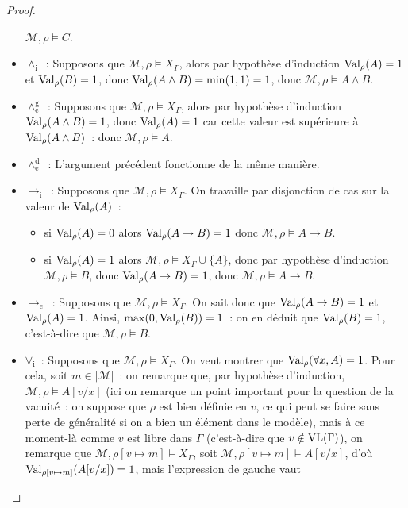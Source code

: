 \begin{proof}
\begin{itemize}
    $\mathcal M,\rho\models C$.
  \item $\land_\mathrm i$~: Supposons que $\mathcal M,\rho\models X_\Gamma$,
    alors par hypothèse d'induction $\operatorname{Val}_\rho(A) = 1$ et $\operatorname{Val}_\rho(B) = 1$,
    donc $\operatorname{Val}_\rho(A\land B) = \min(1,1) = 1$, donc
    $\mathcal M,\rho\models A\land B$.
  \item $\land_\mathrm e^\mathrm g$~: Supposons que
    $\mathcal M,\rho\models X_\Gamma$, alors par hypothèse d'induction
    $\operatorname{Val}_\rho(A\land B) = 1$, donc $\operatorname{Val}_\rho(A) = 1$ car cette valeur est
    supérieure à $\operatorname{Val}_\rho(A\land B)$~: donc $\mathcal M,\rho\models A$.
  \item $\land_\mathrm e^\mathrm d$~: L'argument précédent fonctionne de la même
    manière.
  \item $\to_\mathrm i$~: Supposons que $\mathcal M,\rho\models X_\Gamma$. On
    travaille par disjonction de cas sur la valeur de $\operatorname{Val}_\rho(A)$~:
    \begin{itemize}
    \item si $\operatorname{Val}_\rho(A) = 0$ alors $\operatorname{Val}_\rho(A\to B) = 1$ donc
      $\mathcal M,\rho\models A \to B$.
    \item si $\operatorname{Val}_\rho(A) = 1$ alors $\mathcal M,\rho\models X_\Gamma\cup\{A\}$,
      donc par hypothèse d'induction $\mathcal M,\rho\models B$, donc
      $\operatorname{Val}_\rho(A\to B) = 1$, donc $\mathcal M,\rho\models A \to B$.
    \end{itemize}
  \item $\to_\mathrm e$~: Supposons que $\mathcal M,\rho\models X_\Gamma$. On sait
    donc que $\operatorname{Val}_\rho(A\to B) = 1$ et $\operatorname{Val}_\rho(A) = 1$. Ainsi,
    $\max(0,\operatorname{Val}_\rho(B)) = 1$~: on en déduit que $\operatorname{Val}_\rho(B) = 1$,
    c'est-à-dire que $\mathcal M,\rho\models B$.
  \item $\forall_\mathrm i$~: Supposons que $\mathcal M,\rho\models X_\Gamma$.
    On veut montrer que $\operatorname{Val}_\rho(\forall x, A) = 1$. Pour cela, soit
    $m \in |\mathcal M|$~: on remarque que, par hypothèse d'induction,
    $\mathcal M,\rho\models A[v/x]$ (ici on remarque un point important pour la
    question de la vacuité~: on suppose que $\rho$ est bien définie en $v$, ce
    qui peut se faire sans perte de généralité si on a bien un élément dans le
    modèle), mais à ce moment-là comme $v$ est libre dans $\Gamma$
    (c'est-à-dire que $v\notin\operatorname{VL}(\Gamma)$), on remarque
    que $\mathcal M,\rho[v\mapsto m]\models X_\Gamma$, soit
    $\mathcal M,\rho[v\mapsto m]\models A[v/x]$, d'où
    $\operatorname{Val}_{\rho[v\mapsto m]}(A[v/x]) = 1$, mais l'expression de gauche vaut

\end{itemize}
\end{proof}
